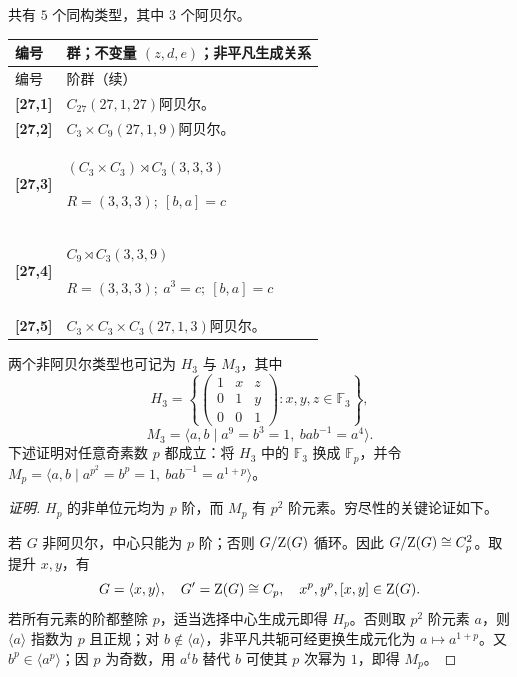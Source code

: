 \documentclass[UTF8,fontset=fandol,11pt,a4paper]{ctexart}
\begin{document}
共有 $5$ 个同构类型，其中 $3$ 个阿贝尔。

\begingroup\small\setlength{\tabcolsep}{3pt}\renewcommand{\arraystretch}{1.12}

\begin{longtable}{@{}p{17mm}>{\raggedright\arraybackslash}p{141mm}@{}}

\toprule 编号 & 群；不变量 $(z,d,e)$；非平凡生成关系\\\midrule\endfirsthead

\toprule 编号 & 27 阶群（续）\\\midrule\endhead\bottomrule\endfoot

\textbf{[27,1]} & $C_{27}$\quad $(27,1,27)$\quad 阿贝尔。\\[3pt]

\textbf{[27,2]} & $C_{3}\times C_{9}$\quad $(27,1,9)$\quad 阿贝尔。\\[3pt]

\textbf{[27,3]} & $(C_{3}\times C_{3})\rtimes C_{3}$\quad $(3,3,3)$\par\(R=(3,3,3);\allowbreak\ [b,a]=c\)\\[3pt]

\textbf{[27,4]} & $C_{9}\rtimes C_{3}$\quad $(3,3,9)$\par\(R=(3,3,3);\allowbreak\ a^{3}=c;\allowbreak\ [b,a]=c\)\\[3pt]

\textbf{[27,5]} & $C_{3}\times C_{3}\times C_{3}$\quad $(27,1,3)$\quad 阿贝尔。\\[3pt]

\end{longtable}\endgroup

两个非阿贝尔类型也可记为 $H_3$ 与 $M_3$，其中\[H_3=\left\{\begin{pmatrix}1&x&z\\0&1&y\\0&0&1\end{pmatrix}:x,y,z\in\mathbb F_3\right\},\]\[M_3=\langle a,b\mid a^9=b^3=1,\ bab^{-1}=a^4\rangle.\]下述证明对任意奇素数 $p$ 都成立：将 $H_3$ 中的 $\mathbb F_3$ 换成 $\mathbb F_p$，并令 $M_p=\langle a,b\mid a^{p^2}=b^p=1,\ bab^{-1}=a^{1+p}\rangle$。

\begin{proof}[证明]
$H_p$ 的非单位元均为 $p$ 阶，而 $M_p$ 有 $p^2$ 阶元素。穷尽性的关键论证如下。

若 $G$ 非阿贝尔，中心只能为 $p$ 阶；否则 $G/\mathrm Z(G)$ 循环。因此 $G/\mathrm Z(G)\cong C_p^2$。取提升 $x,y$，有
\[
G=\langle x,y\rangle,\quad G'=\mathrm Z(G)\cong C_p,\quad x^p,y^p,[x,y]\in\mathrm Z(G).
\]
若所有元素的阶都整除 $p$，适当选择中心生成元即得 $H_p$。否则取 $p^2$ 阶元素 $a$，则 $\langle a\rangle$ 指数为 $p$ 且正规；对 $b\notin\langle a\rangle$，非平凡共轭可经更换生成元化为 $a\mapsto a^{1+p}$。又 $b^p\in\langle a^p\rangle$；因 $p$ 为奇数，用 $a^tb$ 替代 $b$ 可使其 $p$ 次幂为 $1$，即得 $M_p$。
\end{proof}
\end{document}
